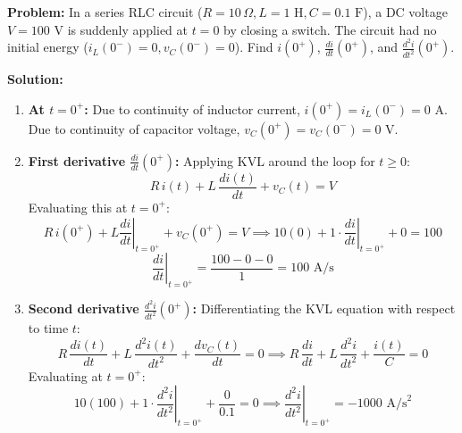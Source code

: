 \documentclass[12pt,a4paper]{article}
\begin{document}
\begin{tcolorbox}[examplebox, title={\textbf{Worked Example: Complete Evaluation of Initial Boundary Derivatives}}]
\textbf{Problem:} In a series RLC circuit ($R=10\,\Omega, L=1\text{ H}, C=0.1\text{ F}$), a DC voltage $V = 100\text{ V}$ is suddenly applied at $t=0$ by closing a switch. The circuit had no initial energy ($i_L(0^-)=0, v_C(0^-)=0$). Find $i(0^+)$, $\frac{di}{dt}(0^+)$, and $\frac{d^2i}{dt^2}(0^+)$.

\textbf{Solution:}
\begin{enumerate}[leftmargin=*]
  \item \textbf{At $t = 0^+$:}
  Due to continuity of inductor current, $i(0^+) = i_L(0^-) = 0\text{ A}$.
  Due to continuity of capacitor voltage, $v_C(0^+) = v_C(0^-) = 0\text{ V}$.
  \item \textbf{First derivative $\frac{di}{dt}(0^+)$:}
  Applying KVL around the loop for $t \ge 0$:
  \begin{equation}
    R\,i(t) + L\,\frac{di(t)}{dt} + v_C(t) = V
  \end{equation}
  Evaluating this at $t = 0^+$:
  \begin{equation}
    R\,i(0^+) + L\left.\frac{di}{dt}\right|_{t=0^+} + v_C(0^+) = V \implies 10(0) + 1 \cdot \left.\frac{di}{dt}\right|_{t=0^+} + 0 = 100
  \end{equation}
  \begin{equation}
    \left.\frac{di}{dt}\right|_{t=0^+} = \frac{100 - 0 - 0}{1} = 100\text{ A/s}
  \end{equation}
  \item \textbf{Second derivative $\frac{d^2i}{dt^2}(0^+)$:}
  Differentiating the KVL equation with respect to time $t$:
  \begin{equation}
    R\,\frac{di(t)}{dt} + L\,\frac{d^2i(t)}{dt^2} + \frac{dv_C(t)}{dt} = 0 \implies R\,\frac{di}{dt} + L\,\frac{d^2i}{dt^2} + \frac{i(t)}{C} = 0
  \end{equation}
  Evaluating at $t = 0^+$:
  \begin{equation}
    10(100) + 1 \cdot \left.\frac{d^2i}{dt^2}\right|_{t=0^+} + \frac{0}{0.1} = 0 \implies \left.\frac{d^2i}{dt^2}\right|_{t=0^+} = -1000\text{ A/s}^2
  \end{equation}
\end{enumerate}
\end{tcolorbox}

\end{document}
